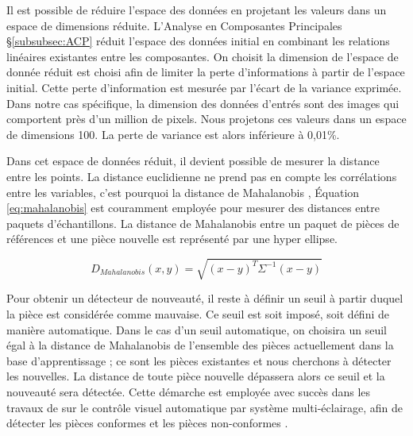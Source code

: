 Il est possible de réduire l'espace des données en projetant les valeurs dans un espace de dimensions réduite.
L'Analyse en Composantes Principales §\ref{subsubsec:ACP} réduit l'espace des données initial en combinant les relations linéaires existantes entre les composantes.
On choisit la dimension de l'espace de donnée réduit est choisi afin de limiter la perte d'informations à partir de l'espace initial.
Cette perte d'information est mesurée par l'écart de la variance exprimée.
Dans notre cas spécifique, la dimension des données d'entrés sont des images qui comportent près d'un million de pixels.
Nous projetons ces valeurs dans un espace de dimensions 100.
La perte de variance est alors inférieure à 0,01\%.

Dans cet espace de données réduit, il devient possible de mesurer la distance entre les points.
La distance euclidienne ne prend pas en compte les corrélations entre les variables, c'est pourquoi la distance de Mahalanobis \cite{mahalanobis_generalised_1936}, Équation \ref{eq:mahalanobis}  est couramment employée pour mesurer des distances entre paquets d'échantillons.
La distance de Mahalanobis entre un paquet de pièces de références et une pièce nouvelle est représenté par une hyper ellipse.

\begin{equation} \label{eq:mahalanobis}
D_{Mahalanobis}(x, y)=\sqrt{(x - y)^{T} \Sigma^{-1}(x-y)}
\end{equation}

Pour obtenir un détecteur de nouveauté, il reste à définir un seuil à partir duquel la pièce est considérée comme mauvaise.
Ce seuil est soit imposé, soit défini de manière automatique.
Dans le cas d'un seuil automatique, on choisira un seuil égal à la distance de Mahalanobis de l'ensemble des pièces actuellement dans la base d'apprentissage ; ce sont les pièces existantes et nous cherchons à détecter les nouvelles.
La distance de toute pièce nouvelle dépassera alors ce seuil et la nouveauté sera détectée.
Cette démarche est employée avec succès dans les travaux de \citeauthor{lacombe_exploitation_2018a} sur le contrôle visuel automatique par système multi-éclairage, afin de détecter les pièces conformes et les pièces non-conformes \cite{lacombe_exploitation_2018a}.

